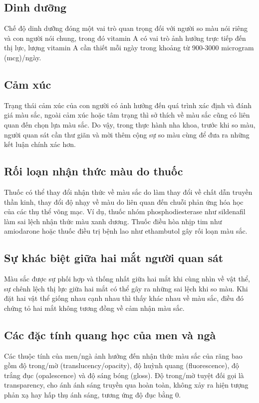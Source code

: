  \subsection{Dinh dưỡng}
 \qquad Chế độ dinh dưỡng đóng một vai trò quan trọng đối với người so màu nói riêng và con người nói chung, trong đó vitamin A có vai trò ảnh hưởng trực tiếp đến thị lực, lượng vitamin A cần thiết mỗi ngày trong khoảng từ 900-3000 microgram (mcg)/ngày.\cite{TruongDinhKhoi}

\subsection{Cảm xúc}
\qquad Trạng thái cảm xúc của con người có ảnh hưởng đến quá trình xác định và đánh giá màu sắc, ngoài cảm xúc hoặc tâm trạng thì sở thích về màu sắc cũng có liên quan đến chọn lựa màu sắc. Do vậy, trong thực hành nha khoa, trước khi so màu, người quan sát cần thư giãn và mời thêm cộng sự so màu cùng để đưa ra những kết luận chính xác hơn.\cite{TruongDinhKhoi}

\subsection{Rối loạn nhận thức màu do thuốc}
\qquad Thuốc có thể thay đổi nhận thức về màu sắc do làm thay đổi về chất dẫn truyền thần kinh, thay đổi độ nhạy về màu do liên quan đến chuỗi phản ứng hóa học của các thụ thể võng mạc. Ví dụ, thuốc nhóm phosphodiesterase như sildenafil làm sai lệch nhận thức màu xanh dương. Thuốc điều hòa nhịp tim như amiodarone hoặc thuốc điều trị bệnh lao như ethambutol gây rối loạn màu sắc.\cite{TruongDinhKhoi}

\subsection{Sự khác biệt giữa hai mắt người quan sát}
\qquad Màu sắc được sự phối hợp và thống nhất giữa hai mắt khi cùng nhìn về vật thể, sự chênh lệch thị lực giữa hai mắt có thể gây ra những sai lệch khi so màu. Khi đặt hai vật thể giống nhau cạnh nhau thì thấy khác nhau về màu sắc, điều đó chứng tỏ hai mắt không tương đồng về cảm nhận màu sắc.\cite{TruongDinhKhoi} 

\subsection{Các đặc tính quang học của men và ngà}
\par 
\qquad Các thuộc tính của men/ngà ảnh hưởng đến nhận thức màu sắc của răng bao gồm độ trong/mờ (translucency/opacity), độ huỳnh quang (fluorescence), độ trắng đục (opalescence) và độ sáng bóng (gloss). Độ trong/mờ tuyệt đối gọi là transparency, cho ánh ánh sáng truyền qua hoàn toàn, không xảy ra hiện tượng phản xạ hay hấp thụ ánh sáng, tương ứng độ đục bằng 0. \cite{TruongDinhKhoi}

